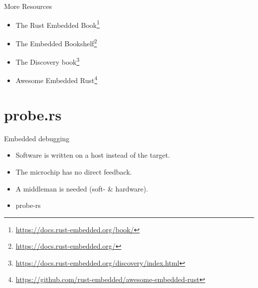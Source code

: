 \documentclass[aspectratio=1610,14pt,t]{beamer}
\begin{document}
\begin{frame}[c]{More Resources}
  \begin{itemize}
    \item The Rust Embedded Book\footnote{\url{https://docs.rust-embedded.org/book/}}
    \item The Embedded Bookshelf\footnote{\url{https://docs.rust-embedded.org/}}
    \item The Discovery book\footnote{\url{https://docs.rust-embedded.org/discovery/index.html}}
    \item Awesome Embedded Rust\footnote{\url{https://github.com/rust-embedded/awesome-embedded-rust}}
  \end{itemize}
\end{frame}

\section{probe.rs}

\begin{frame}[c]{Embedded debugging}
  \begin{itemize}
    \item Software is written on a host instead of the target.
    \item The microchip has no direct feedback.
    \item A middleman is needed (soft- \& hardware).
    \item probe-rs
  \end{itemize}
\end{frame}
\end{document}
